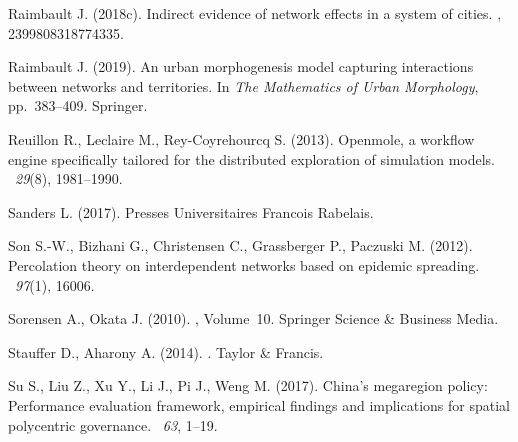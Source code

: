 \documentclass{jimis-en}
\begin{document}
\begin{thebibliography}{}
Raimbault J. (2018c).
\newblock Indirect evidence of network effects in a system of cities.
,
  2399808318774335.


Raimbault J. (2019).
\newblock An urban morphogenesis model capturing interactions between networks
  and territories.
\newblock In {\em The Mathematics of Urban Morphology}, pp.\  383--409.
  Springer.


Reuillon R., Leclaire M., Rey-Coyrehourcq S. (2013).
\newblock Openmole, a workflow engine specifically tailored for the distributed
  exploration of simulation models.
~{\em 29\/}(8), 1981--1990.


Sanders L. (2017).
\newblock Presses Universitaires Francois Rabelais.


Son S.-W., Bizhani G., Christensen C., Grassberger P., Paczuski M. (2012).
\newblock Percolation theory on interdependent networks based on epidemic
  spreading.
~{\em 97\/}(1), 16006.


Sorensen A., Okata J. (2010).
,
  Volume~10.
\newblock Springer Science \& Business Media.


Stauffer D., Aharony A. (2014).
.
\newblock Taylor \& Francis.


Su S., Liu Z., Xu Y., Li J., Pi J., Weng M. (2017).
\newblock China’s megaregion policy: Performance evaluation framework,
  empirical findings and implications for spatial polycentric governance.
~{\em 63}, 1--19.



\end{thebibliography}
\end{document}
